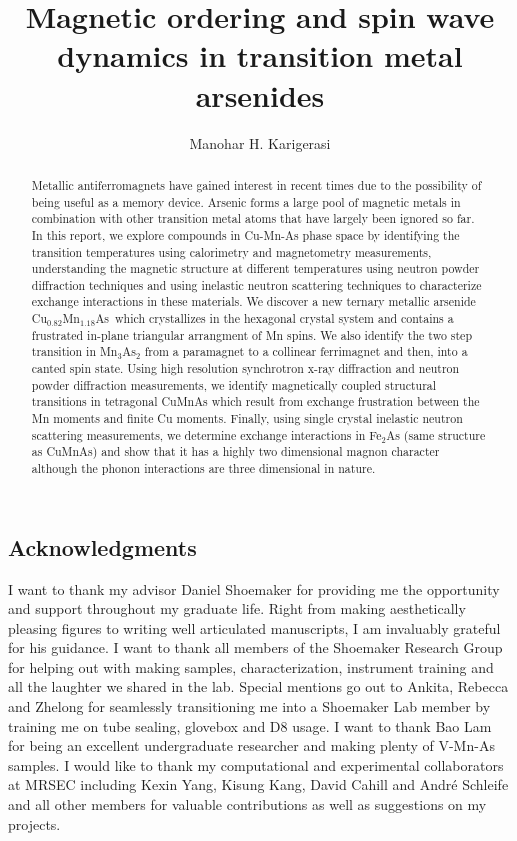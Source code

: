 \documentclass[10pt,doublespacing,edeposit]{uiucthesis2020}
\title{Magnetic ordering and spin wave dynamics in transition metal arsenides}
\author{Manohar H. Karigerasi}
\newcommand*{\cumnas}{Cu$_{0.82}$Mn$_{1.18}$As}
\begin{document}
\maketitle


\begin{frontmatter}

\begin{abstract}
Metallic antiferromagnets have gained interest in recent times due to the possibility of being useful as a memory device. Arsenic forms a large pool of magnetic metals in combination with other transition metal atoms that have largely been ignored so far. In this report, we explore compounds in Cu-Mn-As phase space by identifying the transition temperatures using calorimetry and magnetometry measurements, understanding the magnetic structure at different temperatures using neutron powder diffraction techniques and using inelastic neutron scattering techniques to characterize exchange interactions in these materials. We discover a new ternary metallic arsenide \cumnas\ which crystallizes in the hexagonal crystal system and contains a frustrated in-plane triangular arrangment of Mn spins. We also identify the two step transition in Mn$_3$As$_2$ from a paramagnet to a collinear ferrimagnet and then, into a canted spin state. Using high resolution synchrotron x-ray diffraction and neutron powder diffraction measurements, we identify magnetically coupled structural transitions in tetragonal CuMnAs which result from exchange frustration between the Mn moments and finite Cu moments. Finally, using single crystal inelastic neutron scattering measurements, we determine exchange interactions in Fe$_2$As (same structure as CuMnAs) and show that it has a highly two dimensional magnon character although the phonon interactions are three dimensional in nature.
\end{abstract}

\chapter*{Acknowledgments}

I want to thank my advisor Daniel Shoemaker for providing me the opportunity and support throughout my graduate life. Right from making aesthetically pleasing figures to writing well articulated manuscripts, I am invaluably grateful for his guidance. I want to thank all members of the Shoemaker Research Group for helping out with making samples, characterization, instrument training and all the laughter we shared in the lab. Special mentions go out to Ankita, Rebecca and Zhelong for seamlessly transitioning me into a Shoemaker Lab member by training me on tube sealing, glovebox and D8 usage. I want to thank Bao Lam for being an excellent undergraduate researcher and making plenty of V-Mn-As samples. I would like to thank my computational and experimental collaborators at MRSEC including Kexin Yang, Kisung Kang, David Cahill and Andr\'e Schleife and all other members for valuable contributions as well as suggestions on my projects. 


\end{frontmatter}
\end{document}
